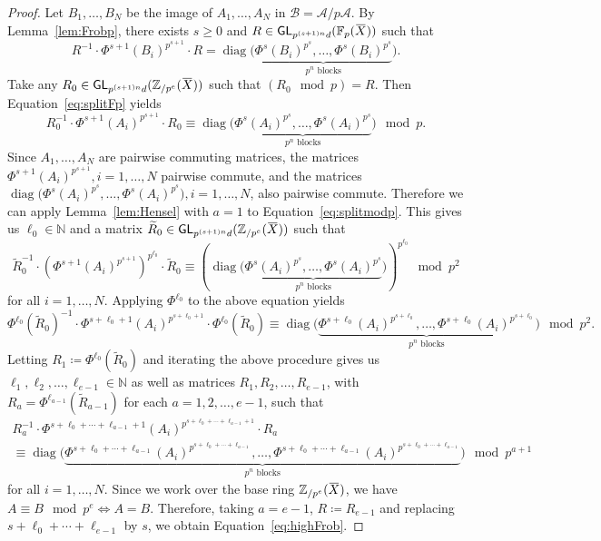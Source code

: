 \documentclass[letterpaper, 11pt, thm-restate]{article}
\numberwithin{equation}{section}
\newcommand{\N}{\mathbb{N}}
\newcommand{\F}{\mathbb{F}}
\newcommand{\Zpe}{\mathbb{Z}_{/p^e}}
\newcommand{\GL}{\mathsf{GL}}
\newcommand{\diag}{\operatorname{diag}}
\newcommand{\mA}{\mathcal{A}}
\newcommand{\mB}{\mathcal{B}}
\newcommand{\tR}{\widetilde{R}}
\newcommand{\oX}{\mkern 1.5mu\overline{\mkern-1.5mu X \mkern-1.5mu}\mkern 1.5mu}
\theoremstyle{definition}
\theoremstyle{definition}
\theoremstyle{definition}
\begin{document}
\prophighFrob*
\begin{proof}
    Let $B_1, \ldots, B_N$ be the image of $A_1, \ldots, A_N$ in $\mB = \mA/p\mA$.
    By Lemma~\ref{lem:Frobp}, there exists $s \geq 0$ and $R \in \GL_{p^{(s+1)n}d}(\F_p(\oX))$ such that
    \begin{equation}\label{eq:splitFp}
    R^{-1} \cdot \Phi^{s+1}(B_i)^{p^{s+1}} \cdot R = \diag\Big(\underbrace{\Phi^{s}(B_i)^{p^s}, \ldots, \Phi^{s}(B_i)^{p^s}}_{p^n \text{ blocks}}\Big).
    \end{equation}
    Take any $R_0 \in \GL_{p^{(s+1)n}d}(\Zpe(\oX))$ such that $(R_0 \mod p) = R$. Then Equation~\eqref{eq:splitFp} yields
    \begin{equation}\label{eq:splitmodp}
    R_0^{-1} \cdot \Phi^{s+1}(A_i)^{p^{s+1}} \cdot R_0 \equiv \diag\Big(\underbrace{\Phi^{s}(A_i)^{p^{s}}, \ldots, \Phi^{s}(A_i)^{p^{s}}}_{p^n \text{ blocks}}\Big) \mod p.
    \end{equation}
    Since $A_1, \ldots, A_N$ are pairwise commuting matrices, the matrices $\Phi^{s+1}(A_i)^{p^{s+1}}, i = 1, \ldots, N$ pairwise commute, and the matrices $\diag\big(\Phi^{s}(A_i)^{p^{s}}, \ldots, \Phi^{s}(A_i)^{p^{s}}\big), i = 1, \ldots, N$, also pairwise commute.
    Therefore we can apply Lemma~\ref{lem:Hensel} with $a = 1$ to Equation~\eqref{eq:splitmodp}.
    This gives us $\ell_0 \in \N$ and a matrix $\tR_0 \in \GL_{p^{(s+1)n}d}(\Zpe(\oX))$ such that 
    \[
    \tR_0^{-1} \cdot \left(\Phi^{s+1}(A_i)^{p^{s+1}}\right)^{p^{\ell_0}} \cdot \tR_0 \equiv \left(\diag\Big(\underbrace{\Phi^{s}(A_i)^{p^{s}}, \ldots, \Phi^{s}(A_i)^{p^{s}}}_{p^n \text{ blocks}}\Big)\right)^{p^{\ell_0}} \mod p^{2}
    \]
    for all $i = 1, \ldots, N$.
    Applying $\Phi^{\ell_0}$ to the above equation yields
    \[
    \Phi^{\ell_0}(\tR_0)^{-1} \cdot \Phi^{s+\ell_0+1}(A_i)^{p^{s+\ell_0+1}} \cdot \Phi^{\ell_0}(\tR_0) \equiv \diag\Big(\underbrace{\Phi^{s+\ell_0}(A_i)^{p^{s+\ell_0}}, \ldots, \Phi^{s+\ell_0}(A_i)^{p^{s+\ell_0}}}_{p^n \text{ blocks}}\Big) \mod p^{2}.
    \]
    Letting $R_1 \coloneqq \Phi^{\ell_0}(\tR_0)$ and iterating the above procedure gives us $\ell_1, \ell_2, \ldots, \ell_{e-1} \in \N$ as well as matrices $R_1, R_2, \ldots, R_{e-1}$, with $R_{a} = \Phi^{\ell_{a-1}}(\tR_{a-1})$ for each $a = 1, 2, \ldots, e-1$, such that
    \begin{multline*}
    R_a^{-1} \cdot \Phi^{s+\ell_0 + \cdots + \ell_{a-1} +1}(A_i)^{p^{s+\ell_0 + \cdots + \ell_{a-1}+1}} \cdot R_a \\
    \equiv \diag\Big(\underbrace{\Phi^{s+\ell_0 + \cdots + \ell_{a-1}}(A_i)^{p^{s+\ell_0 + \cdots + \ell_{a-1}}}, \ldots, \Phi^{s+\ell_0 + \cdots + \ell_{a-1}}(A_i)^{p^{s+\ell_0 + \cdots + \ell_{a-1}}}}_{p^n \text{ blocks}}\Big) \mod p^{a+1}
    \end{multline*}
    for all $i = 1, \ldots, N$.
    Since we work over the base ring $\Zpe(\oX)$, we have $A \equiv B \mod p^e \iff A = B$.
    Therefore, taking $a = e-1$, $R \coloneqq R_{e-1}$ and replacing $s+\ell_0 + \cdots + \ell_{e-1}$ by $s$, we obtain Equation~\eqref{eq:highFrob}.
\end{proof}
\end{document}
